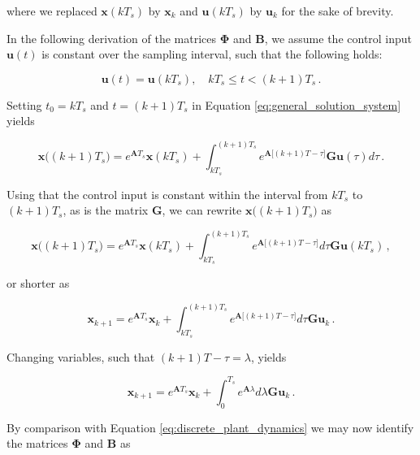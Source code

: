 \noindent
where we replaced $\bm{x}(k T_s)$ by $\bm{x}_k$ and $\bm{u}(k T_s)$ by $\bm{u}_k$ for the sake of brevity.

In the following derivation of the matrices $\bm{\Phi}$ and $\bm{B}$, we assume the control input $\bm{u}(t)$ is constant over the sampling interval, such that the following holds:

\begin{equation}
  \bm{u}(t) = \bm{u}(k T_s), \quad kT_s \leq t < (k+1) T_s\,.
\end{equation}

\noindent
Setting $t_0 = kT_s$ and $t = (k+1) T_s$ in Equation \ref{eq:general_solution_system} yields

\begin{equation}\label{eq:general_solution_system_discrete}
  \bm{x}\big((k+1) T_s\big) = e^{\bm{A}T_s} \bm{x}(kT_s) +\int_{kT_s}^{(k+1) T_s} e^{\bm{A}\big[(k+1) T - \tau\big]}\bm{G}\bm{u}(\tau)d\tau\,.
\end{equation}

\noindent
Using that the control input is constant within the interval from $kT_s$ to $(k + 1)T_s$, as is the matrix $\bm{G}$, we can rewrite $\bm{x}\big((k+1) T_s\big)$ as

\begin{equation}\label{eq:general_solution_system_discrete}
  \bm{x}\big((k+1) T_s\big) = e^{\bm{A}T_s} \bm{x}(kT_s) +\int_{kT_s}^{(k+1) T_s} e^{\bm{A}\big[(k+1) T - \tau\big]}d\tau \bm{G}\bm{u}(k T_s)\,,
\end{equation}

\noindent
or shorter as

\begin{equation}\label{eq:general_solution_system_discrete}
  \bm{x}_{k+1} = e^{\bm{A}T_s} \bm{x}_k +\int_{kT_s}^{(k+1) T_s} e^{\bm{A}\big[(k+1) T - \tau\big]}d\tau \bm{G}\bm{u}_k\,.
\end{equation}

\noindent
Changing variables, such that $(k+1)T - \tau = \lambda$, yields

\begin{equation}\label{eq:general_solution_system_discrete}
  \bm{x}_{k+1} = e^{\bm{A}T_s} \bm{x}_k +\int_{0}^{T_s} e^{\bm{A}\lambda}d\lambda \bm{G}\bm{u}_k\,.
\end{equation}

\noindent
By comparison with Equation \ref{eq:discrete_plant_dynamics} we may now identify the matrices $\bm{\Phi}$ and $\bm{B}$ as

